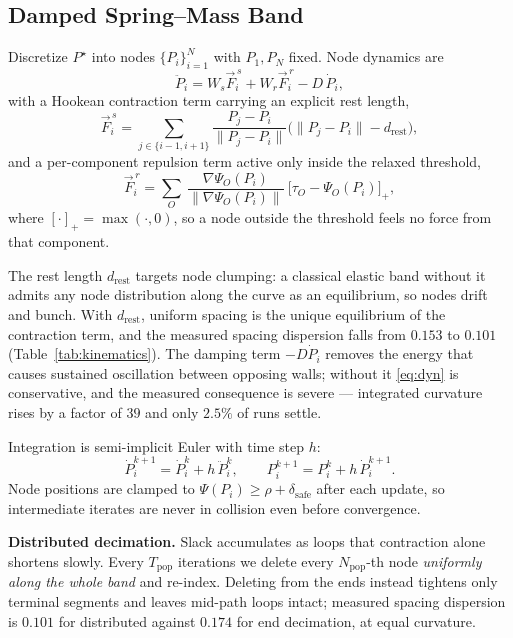 \documentclass[conference]{IEEEtran}
\begin{document}
\subsection{Damped Spring--Mass Band}

Discretize $P^\star$ into nodes $\{P_i\}_{i=1}^{N}$ with $P_1,P_N$ fixed. Node dynamics are
\begin{equation}
\ddot{P}_i = W_s \vec{F}^{\,s}_i + W_r \vec{F}^{\,r}_i - D\,\dot{P}_i ,
\label{eq:dyn}
\end{equation}
with a Hookean contraction term carrying an explicit rest length,
\begin{equation}
\vec{F}^{\,s}_i=\!\!\sum_{j\in\{i-1,i+1\}}\!\!\frac{P_j-P_i}{\|P_j-P_i\|}\Big(\|P_j-P_i\|-d_{\mathrm{rest}}\Big),
\end{equation}
and a per-component repulsion term active only inside the relaxed threshold,
\begin{equation}
\vec{F}^{\,r}_i=\sum_{O}\ \frac{\nabla\Psi_O(P_i)}{\|\nabla\Psi_O(P_i)\|}\ \big[\tau_O-\Psi_O(P_i)\big]_+ ,
\end{equation}
where $[\cdot]_+=\max(\cdot,0)$, so a node outside the threshold feels no force from that component.

The rest length $d_{\mathrm{rest}}$ targets node clumping: a classical elastic band without it admits any node distribution along the curve as an equilibrium, so nodes drift and bunch. With $d_{\mathrm{rest}}$, uniform spacing is the unique equilibrium of the contraction term, and the measured spacing dispersion falls from $0.153$ to $0.101$ (Table~\ref{tab:kinematics}). The damping term $-D\dot{P}_i$ removes the energy that causes sustained oscillation between opposing walls; without it \eqref{eq:dyn} is conservative, and the measured consequence is severe --- integrated curvature rises by a factor of $39$ and only $2.5\%$ of runs settle.

Integration is semi-implicit Euler with time step $h$:
\begin{equation}
\dot{P}_i^{k+1}=\dot{P}_i^{k}+h\,\ddot{P}_i^{k},\qquad P_i^{k+1}=P_i^{k}+h\,\dot{P}_i^{k+1}.
\end{equation}
Node positions are clamped to $\Psi(P_i)\ge\rho+\delta_{\mathrm{safe}}$ after each update, so intermediate iterates are never in collision even before convergence.

\textbf{Distributed decimation.} Slack accumulates as loops that contraction alone shortens slowly. Every $T_{\mathrm{pop}}$ iterations we delete every $N_{\mathrm{pop}}$-th node \emph{uniformly along the whole band} and re-index. Deleting from the ends instead tightens only terminal segments and leaves mid-path loops intact; measured spacing dispersion is $0.101$ for distributed against $0.174$ for end decimation, at equal curvature.
\end{document}

